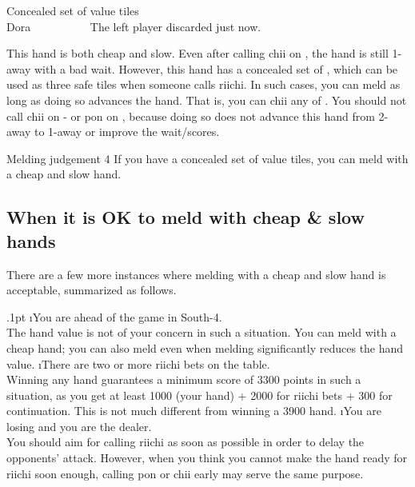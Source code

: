 \begin{itembox}[r]{Concealed set of value tiles}
\bp
{}\zhong\zhong\zhong~~\xi\\
\hfill\footnotesize{{\jap Dora}~~~~~~~~~~}
\ep
\vspace{-20pt}The left player discarded {\LARGE{}} just now.
\end{itembox}

\noindent
This hand is both cheap and slow. Even after calling {\jap chii} on {\LARGE{}}, the hand is still 1-away with a bad wait. However, this hand has a concealed set of {\LARGE\zhong}, which can be used as three safe tiles when someone calls riichi. In such cases, you can meld as long as doing so advances the hand. That is, you can {\jap chii} any of {\LARGE{}}. You should not call {\jap chii} on {\LARGE{}-} or {\jap pon} on {\LARGE{}}, because doing so does not advance this hand from 2-away to 1-away or improve the wait/scores. 

\bigskip
\color{MyRed}
\begin{itembox}[c]{Melding judgement 4}\normalcolor
If you have a concealed set of value tiles, you can meld with a cheap and slow hand.
\end{itembox}\normalcolor

\subsection{When it is OK to meld with cheap \& slow hands}
There are a few more instances where melding with a cheap and slow hand is acceptable, summarized as follows. 

\be\itemsep.1pt
\i You are ahead of the game in South-4.\\
The hand value is not of your concern in such a situation. You can meld with a cheap hand; you can also meld even when melding significantly reduces the hand value.
\i There are two or more riichi bets on the table.\\
Winning any hand guarantees a minimum score of 3300 points in such a situation, as you get at least 1000 (your hand) + 2000 for riichi bets + 300 for continuation. This is not much different from winning a 3900 hand.
\i You are losing and you are the dealer.\\
You should aim for calling riichi as soon as possible in order to delay the opponents' attack. However, when you think you cannot make the hand ready for riichi soon enough, calling {\jap pon} or {\jap chii} early may serve the same purpose. 
\ee

